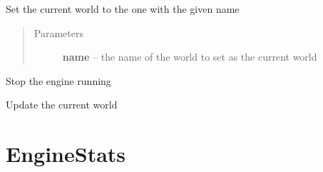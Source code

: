 \documentclass[letterpaper,10pt,english]{sphinxmanual}
\begin{document}
\begin{fulllineitems}
\begin{fulllineitems}
\begin{quote}
\begin{description}
\end{description}\end{quote}

\end{fulllineitems}


\begin{fulllineitems}
\label{engine:serge.engine.Engine.setCurrentWorldByName}
Set the current world to the one with the given name
\begin{quote}\begin{description}
\item[{Parameters}] \leavevmode
\textbf{name} -- the name of the world to set as the current world

\end{description}\end{quote}

\end{fulllineitems}


\begin{fulllineitems}
\label{engine:serge.engine.Engine.stop}
Stop the engine running

\end{fulllineitems}


\begin{fulllineitems}
\label{engine:serge.engine.Engine.updateWorld}
Update the current world

\end{fulllineitems}


\end{fulllineitems}



\section{EngineStats}
\label{engine:enginestats}
\end{document}
